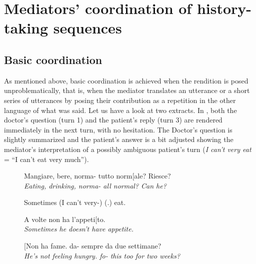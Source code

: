 \documentclass[output=paper]{LSP/langsci}
\begin{document}
\section{Mediators' coordination of history-taking sequences}
\subsection{Basic coordination}

As mentioned above, basic coordination is achieved when the rendition is posed unproblematically, that is, when the mediator translates an utterance or a short series of utterances by posing their contribution as a repetition in the other language of what was said. Let us have a look at two extracts. In , both the doctor's question (turn 1) and the patient's reply (turn 3) are rendered immediately in the next turn, with no hesitation. The Doctor's question is slightly summarized and the patient's answer is a bit adjusted showing the mediator's interpretation of a possibly ambiguous patient's turn (\textit{I can't very eat} = ``I can't eat very much'').

\begin{figure}
	\begin{varwidth}{\textwidth}
	\begin{description}[align=left, nosep, style=nextline, leftmargin=3em, format=\normalfont\footnotesize]
	\item [1 \hspace{0.3em} D:] Mangiare, bere, norma- tutto norm[ale? Riesce? \\ \textit{Eating, drinking, norma- all normal? Can he?}
	\item [2 \hspace{0.3em} M:] [Do you: eat (.) normally?	
	\item [3 \hspace{0.3em} P:] Sometimes (I can't very-) (.) eat.
	\item [4 \hspace{0.3em} M:] A volte non ha l'appeti[to. \\ \textit{Sometimes he doesn't have appetite.}
	\item [5 \hspace{0.3em} D:] [Non ha fame. da- sempre da due settimane? \\\textit{He's not feeling hungry. fo- this too for two weeks?}
	\end{description}
    \end{varwidth}
\caption{}
\label{baraldi-gavioli:extract:1}
\end{figure}
\end{document}
